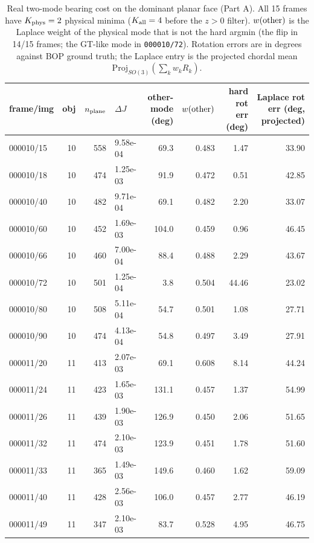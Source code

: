 \begin{table}[t]
\centering
\caption{Real two-mode bearing cost on the dominant planar face (Part A). All 15 frames have $K_{\rm phys}=2$ physical minima ($K_{\rm all}=4$ before the $z>0$ filter). $w({\rm other})$ is the Laplace weight of the physical mode that is not the hard argmin (the flip in 14/15 frames; the GT-like mode in \texttt{000010/72}). Rotation errors are in degrees against BOP ground truth; the Laplace entry is the projected chordal mean $\mathrm{Proj}_{SO(3)}(\sum_kw_kR_k)$.}
\label{tab:twomode}
\scriptsize
\setlength{\tabcolsep}{4pt}
\begin{tabular}{@{}l r r l r r r r@{}}
\toprule
frame/img & obj & $n_{\rm plane}$ & $\Delta J$ & other-mode (deg) & $w({\rm other})$ & hard rot err (deg) & Laplace rot err (deg, projected)\\
\midrule
000010/15 & 10 & 558 & 9.58e-04 & 69.3 & 0.483 & 1.47 & 33.90\\
000010/18 & 10 & 474 & 1.25e-03 & 91.9 & 0.472 & 0.51 & 42.85\\
000010/40 & 10 & 482 & 9.71e-04 & 69.1 & 0.482 & 2.20 & 33.07\\
000010/60 & 10 & 452 & 1.69e-03 & 104.0 & 0.459 & 0.96 & 46.45\\
000010/66 & 10 & 460 & 7.00e-04 & 88.4 & 0.488 & 2.29 & 43.67\\
000010/72 & 10 & 501 & 1.25e-04 & 3.8 & 0.504 & 44.46 & 23.02\\
000010/80 & 10 & 508 & 5.11e-04 & 54.7 & 0.501 & 1.08 & 27.71\\
000010/90 & 10 & 474 & 4.13e-04 & 54.8 & 0.497 & 3.49 & 27.91\\
000011/20 & 11 & 413 & 2.07e-03 & 69.1 & 0.608 & 8.14 & 44.24\\
000011/24 & 11 & 423 & 1.65e-03 & 131.1 & 0.457 & 1.37 & 54.99\\
000011/26 & 11 & 439 & 1.90e-03 & 126.9 & 0.450 & 2.06 & 51.65\\
000011/32 & 11 & 474 & 2.10e-03 & 123.9 & 0.451 & 1.78 & 51.60\\
000011/33 & 11 & 365 & 1.49e-03 & 149.6 & 0.460 & 1.62 & 59.09\\
000011/40 & 11 & 428 & 2.56e-03 & 106.0 & 0.457 & 2.77 & 46.19\\
000011/49 & 11 & 347 & 2.10e-03 & 83.7 & 0.528 & 4.95 & 46.75\\
\bottomrule
\end{tabular}
\end{table}


